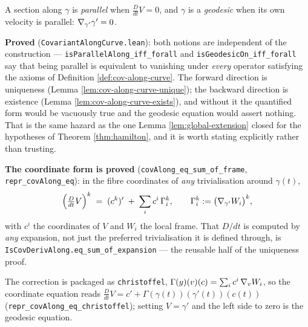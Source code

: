 \begin{definition}
  \label{def:geodesic}
  \leanok
  A section along $\gamma$ is \emph{parallel} when $\frac{D}{dt}V = 0$, and $\gamma$ is a
  \emph{geodesic} when its own velocity is parallel: $\nabla_{\gamma'}\gamma' = 0$.

  \textbf{Proved} (\texttt{CovariantAlongCurve.lean}): both notions are
  independent of the construction ---
  \texttt{isParallelAlong\_iff\_forall} and
  \texttt{isGeodesicOn\_iff\_forall} say that being parallel is equivalent to
  vanishing under \emph{every} operator satisfying the axioms of Definition
  \ref{def:cov-along-curve}. The forward direction is uniqueness (Lemma
  \ref{lem:cov-along-curve-unique}); the backward direction is existence
  (Lemma \ref{lem:cov-along-curve-exists}), and without it the quantified form
  would be vacuously true and the geodesic equation would assert nothing. That
  is the same hazard as the one Lemma \ref{lem:global-extension} closed for the
  hypotheses of Theorem \ref{thm:hamilton}, and it is worth stating
  explicitly rather than trusting.

  \textbf{The coordinate form is proved} (\texttt{covAlong\_eq\_sum\_of\_frame},
  \texttt{repr\_covAlong\_eq}): in the fibre coordinates of \emph{any}
  trivialisation around $\gamma(t)$,
  \[
    \Bigl(\tfrac{D}{dt}V\Bigr)^{k} \;=\; (c^{k})' \;+\; \sum_i c^{i}\,\Gamma^{k}_{i},
    \qquad \Gamma^{k}_{i} := \bigl(\nabla_{\gamma'}W_i\bigr)^{k},
  \]
  with $c^i$ the coordinates of $V$ and $W_i$ the local frame. That $D/dt$ is
  computed by \emph{any} expansion, not just the preferred trivialisation it is
  defined through, is \texttt{IsCovDerivAlong.eq\_sum\_of\_expansion} --- the
  reusable half of the uniqueness proof.

  The correction is packaged as \texttt{christoffel}, $\Gamma(y)(v)(c) =
  \sum_i c^i\,\nabla_v W_i$, so the coordinate equation reads
  $\frac{D}{dt}V = c' + \Gamma(\gamma(t))(\gamma'(t))(c(t))$
  (\texttt{repr\_covAlong\_eq\_christoffel}); setting $V = \gamma'$ and the left
  side to zero is the geodesic equation.


\end{definition}

